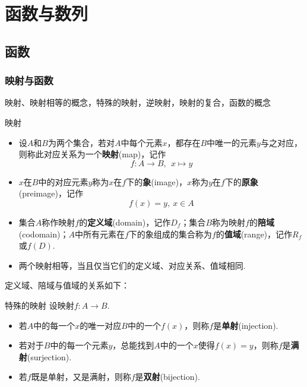\documentclass[lang=cn, zihao=4.5]{elegantbook}
\begin{document}
\part{函数与数列}

\setcounter{chapter}{0}
\chapter{函数}

\section{映射与函数}

映射、映射相等的概念，特殊的映射，逆映射，映射的复合，函数的概念

\begin{definition}{映射}
	\begin{itemize}
		\item 设$A$和$B$为两个集合，若对$A$中每个元素$x$，都存在$B$中唯一的元素$y$与之对应，则称此对应关系为一个\textbf{映射}(map)，记作$$f:A \to B,~~x \mapsto y$$
		\item $x$在$B$中的对应元素$y$称为$x$在$f$下的\textbf{象}(image)，$x$称为$y$在$f$下的\textbf{原象}(preimage)，记作$$f(x) = y,~ x \in A$$
		\item 集合$A$称作映射$f$的\textbf{定义域}(domain)，记作$D_f$；集合$B$称为映射$f$的\textbf{陪域}(codomain)；$A$中所有元素在$f$下的象组成的集合称为$f$的\textbf{值域}(range)，记作$R_f$或$f(D)$.
		\item 两个映射相等，当且仅当它们的定义域、对应关系、值域相同.
	\end{itemize}
\end{definition}

定义域、陪域与值域的关系如下：


\begin{definition}{特殊的映射}
	设映射$f:A \to B$.
	\begin{itemize}
		\item 若$A$中的每一个$x$的唯一对应$B$中的一个$f(x)$，则称$f$是\textbf{单射}(injection).
		\item 若对于$B$中的每一个元素$y$，总能找到$A$中的一个$x$使得$f(x)=y$，则称$f$是\textbf{满射}(surjection).
		\item 若$f$既是单射，又是满射，则称$f$是\textbf{双射}(bijection).
	\end{itemize}
\end{definition}
\end{document}
